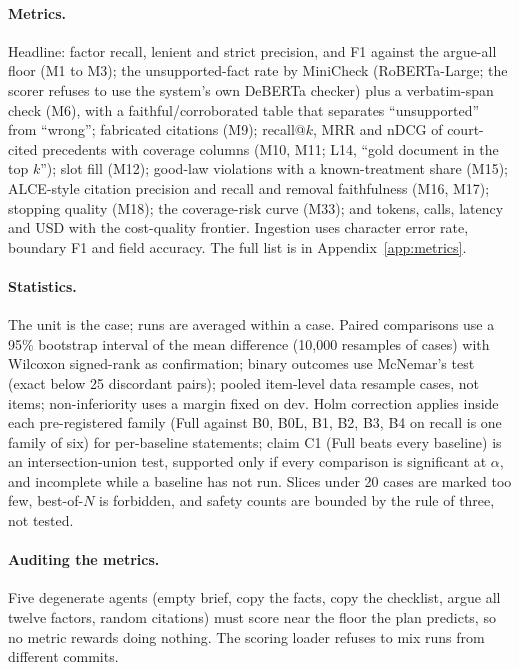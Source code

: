 \paragraph{Metrics.} Headline: factor recall, lenient and strict precision, and F1 against the argue-all floor (M1 to M3); the unsupported-fact rate by MiniCheck (RoBERTa-Large; the scorer refuses to use the system's own DeBERTa checker) plus a verbatim-span check (M6), with a faithful/corroborated table that separates ``unsupported'' from ``wrong''; fabricated citations (M9); recall@$k$, MRR and nDCG of court-cited precedents with coverage columns (M10, M11; L14, ``gold document in the top $k$''); slot fill (M12); good-law violations with a known-treatment share (M15); ALCE-style citation precision and recall and removal faithfulness (M16, M17); stopping quality (M18); the coverage-risk curve (M33); and tokens, calls, latency and USD with the cost-quality frontier. Ingestion uses character error rate, boundary F1 and field accuracy. The full list is in Appendix~\ref{app:metrics}.

\paragraph{Statistics.} The unit is the case; runs are averaged within a case. Paired comparisons use a 95\% bootstrap interval of the mean difference (10,000 resamples of cases) with Wilcoxon signed-rank as confirmation; binary outcomes use McNemar's test (exact below 25 discordant pairs); pooled item-level data resample cases, not items; non-inferiority uses a margin fixed on dev. Holm correction applies inside each pre-registered family (Full against B0, B0L, B1, B2, B3, B4 on recall is one family of six) for per-baseline statements; claim C1 (Full beats every baseline) is an intersection-union test, supported only if every comparison is significant at $\alpha$, and incomplete while a baseline has not run. Slices under 20 cases are marked too few, best-of-$N$ is forbidden, and safety counts are bounded by the rule of three, not tested.

\paragraph{Auditing the metrics.} Five degenerate agents (empty brief, copy the facts, copy the checklist, argue all twelve factors, random citations) must score near the floor the plan predicts, so no metric rewards doing nothing. The scoring loader refuses to mix runs from different commits.
